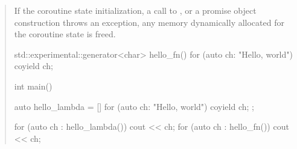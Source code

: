\begin{quote}
%
%





\pnum
If the coroutine state initialization, a call to , or a promise object construction throws
an exception, 
any memory dynamically allocated 
for the coroutine state is freed.

\pnum
\enterexample
\begin{codeblock}
std::experimental::generator<char> hello_fn() {
  for (auto ch: "Hello, world") coyield ch;
}
  
int main() {
  auto hello_lambda = []{ for (auto ch: "Hello, world") coyield ch; };
  
  for (auto ch : hello_lambda()) 
     cout << ch;
  for (auto ch : hello_fn()) 
     cout << ch;
}
\end{codeblock}
\exitexample




\end{quote}
